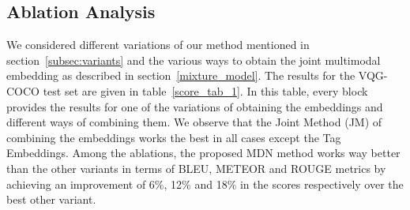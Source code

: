 \documentclass[11pt,a4paper]{article}
\begin{document}
\subsection{Ablation Analysis}\label{ablation_analysis}
We considered different variations of our method mentioned  in section~\ref{subsec:variants} and the various ways to obtain the joint multimodal embedding as described in section~\ref{mixture_model}. The results for the VQG-COCO test set are given in table~\ref{score_tab_1}. In this table, every block provides the results for one of the variations of obtaining the embeddings and different ways of combining them. We observe that the Joint Method (JM) of combining the embeddings works the best in all cases except the Tag Embeddings. Among the ablations, the proposed MDN method works way better than the other variants in terms of BLEU, METEOR and ROUGE metrics by achieving an improvement of 6\%, 12\% and 18\% in the scores respectively over the best other variant. 
\end{document}
